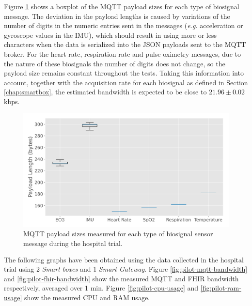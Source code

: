 Figure \ref{fig:labtest-mqtt-payload-sizes} shows a boxplot of the \acs{MQTT} payload sizes for each type of biosignal message. The deviation in the payload lengths is caused by variations of the number of digits in the numeric entries sent in the messages (\textit{e.g.} acceleration or gyroscope values in the \acs{IMU}), which should result in using more or less characters when the data is serialized into the \acs{JSON} payloads sent to the \acs{MQTT} broker. For the heart rate, respiration rate and pulse oximetry messages, due to the nature of these biosignals the number of digits does not change, so the payload size remains constant throughout the tests. Taking this information into account, together with the acquisition rate for each biosignal as defined in Section \ref{chap:smartbox}, the estimated bandwidth is expected to be close to $ 21.96 \pm 0.02$ kbps.

\begin{figure}[H]
    \centering
    \includegraphics[width=0.85\linewidth]{images/labtest_mqtt_payload_sizes.pdf}
    \caption{\acs{MQTT} payload sizes measured for each type of biosignal sensor message during the hospital trial.}
    \label{fig:labtest-mqtt-payload-sizes}
\end{figure}

The following graphs have been obtained using the data collected in the hospital trial using 2 \textit{Smart boxes} and 1 \textit{Smart Gateway}. Figure \ref{fig:pilot-mqtt-bandwidth} and \ref{fig:pilot-fhir-bandwidth} show the measured \acs{MQTT} and \acs{FHIR} bandwidth respectively, averaged over 1 min.  Figure \ref{fig:pilot-cpu-usage} and \ref{fig:pilot-ram-usage} show the measured \acs{CPU} and \acs{RAM} usage.

